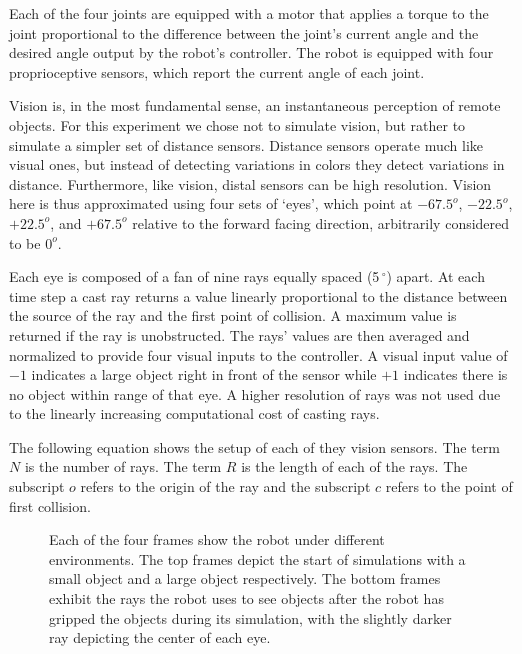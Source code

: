 \documentclass{sig-alternate}
\begin{document}
Each of the four joints are equipped with a motor that applies a torque to the joint proportional to the difference between the joint's current angle and the desired angle output by
the robot's controller. The robot is equipped with four proprioceptive sensors, which report the current angle of each joint.

Vision is, in the most fundamental sense, an instantaneous perception of remote objects. For this experiment we chose not to simulate vision, but rather to simulate 
a simpler set of distance sensors. Distance sensors operate much like visual ones, but instead of detecting variations in colors they detect variations in distance. Furthermore, like vision, distal sensors can be high resolution. Vision here is thus approximated using four sets of `eyes', which point at $-67.5^o$, $-22.5^o$, $+22.5^o$, and $+67.5^o$ relative to the forward facing direction, arbitrarily considered to be $0^o$.

Each eye is composed of a fan of nine rays equally spaced (5$\,^{\circ}$) apart. At each time step a cast ray returns a value linearly proportional to the distance between the source of the ray and the first point of collision. A maximum value is returned if the ray is unobstructed. The rays' values are then averaged and normalized to provide four visual inputs to the controller. A visual input value of $-1$ indicates a large object right in front of the sensor while $+1$ indicates there is no object within range of that eye. A higher resolution of rays was not used due to the linearly increasing computational cost of casting rays.

The following equation shows the setup of each of they vision sensors. The term $N$ is the number of rays. The term $R$ is the length of each of the rays. The subscript $o$ refers to the origin of the ray and the subscript $c$ refers to the point of first collision. 

\begin{figure}[!t]
  \centering
  \caption{Each of the four frames show the robot under different environments. The top frames depict the start of simulations with a small object and a large object respectively. The bottom frames exhibit the rays the robot uses to see objects after the robot has gripped the objects during its simulation, with the slightly darker ray depicting the center of each eye.}
  \vspace{-0.3cm} 
  \label {fig:robot}
\end{figure}
\end{document}
